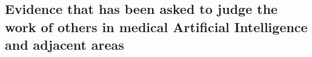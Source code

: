 \documentclass[11pt]{article}
\begin{document}

%


\subsection{Evidence that \dr has been asked to judge the work of others in medical Artificial Intelligence and adjacent areas}
\label{reviews}
\end{document}
